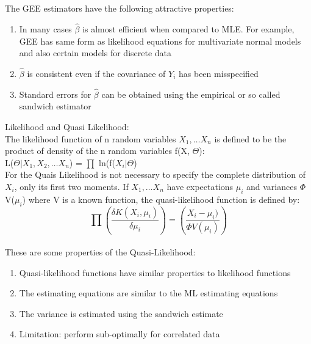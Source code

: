 \documentclass[letterpaper,11pt]{article}
\begin{document}
\\ \\

The GEE estimators have the following attractive properties:

\begin{enumerate}

\item In many cases $\hat{\beta}$ is almost efficient when compared to MLE. For example, GEE has same form as likelihood equations for multivariate normal models and also certain models for discrete data
\item $\hat{\beta}$ is consistent even if the covariance of $Y_{i}$ has been misspecified
\item Standard errors for $\hat{\beta}$ can be obtained using the empirical or so called sandwich estimator

\end{enumerate}

Likelihood and Quasi Likelihood:\\

The likelihood function of n random variables $X_{1}, \ldots X_{n}$ is defined to be the product of density of the n random variables
f(X, $\Theta$):\\

L($\Theta|X_{1}, X_{2}, \ldots X_{n}$) = $\prod$ ln(f($X_{i}|\Theta$) \\

For the Quais Likelihood is not necessary to specify the complete distribution of $X_{i}$, only its first two moments.
If $X_{1}, \ldots X_{n}$ have expectations $\mu_{i}$ and variances $\Phi$ V($\mu_{i}$) where V is a known function, the quasi-likelihood
function is defined by:\\

\begin{equation}
\prod (\frac { \delta K (X_{i}, \mu_{i})} {\delta \mu_{i}} ) = (\frac { X_{i}-\mu_{i})} {\Phi V(\mu_{i})} ) 
\end{equation}
\\
These are some properties of the Quasi-Likelihood:\\
\begin{enumerate}
\item Quasi-likelihood functions have similar properties to likelihood functions
\item The estimating equations are similar to the ML estimating equations
\item The variance is estimated using the sandwich estimate
\item Limitation: perform sub-optimally for correlated data
\end{enumerate}
\end{document}
